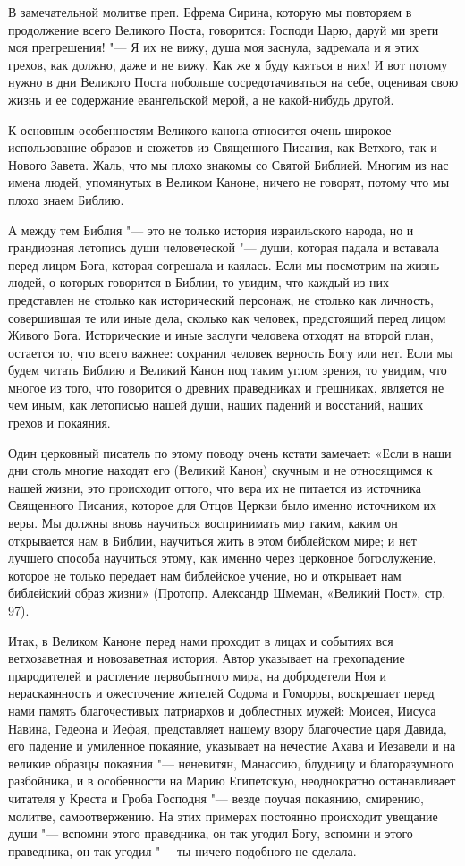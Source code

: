 В замечательной молитве преп. Ефрема Сирина, которую мы повторяем в продолжение всего Великого Поста, говорится: Господи Царю, даруй ми зрети моя прегрешения! "--- Я их не вижу, душа моя заснула, задремала и я этих грехов, как должно, даже и не вижу. Как же я буду каяться в них! И вот потому нужно в дни Великого Поста побольше сосредотачиваться на себе, оценивая свою жизнь и ее содержание евангельской мерой, а не какой-нибудь другой.


К основным особенностям Великого канона относится очень широкое использование образов и сюжетов из Священного Писания, как Ветхого, так и Нового Завета. Жаль, что мы плохо знакомы со Святой Библией. Многим из нас имена людей, упомянутых в Великом Каноне, ничего не говорят, потому что мы плохо знаем Библию.


А между тем Библия "--- это не только история израильского народа, но и грандиозная летопись души человеческой "--- души, которая падала и вставала перед лицом Бога, которая согрешала и каялась. Если мы посмотрим на жизнь людей, о которых говорится в Библии, то увидим, что каждый из них представлен не столько как исторический персонаж, не столько как личность, совершившая те или иные дела, сколько как человек, предстоящий перед лицом Живого Бога. Исторические и иные заслуги человека отходят на второй план, остается то, что всего важнее: сохранил человек верность Богу или нет. Если мы будем читать Библию и Великий Канон под таким углом зрения, то увидим, что многое из того, что говорится о древних праведниках и грешниках, является не чем иным, как летописью нашей души, наших падений и восстаний, наших грехов и покаяния.


Один церковный писатель по этому поводу очень кстати замечает: «Если в наши дни столь многие находят его (Великий Канон) скучным и не относящимся к нашей жизни, это происходит оттого, что вера их не питается из источника Священного Писания, которое для Отцов Церкви было именно источником их веры. Мы должны вновь научиться воспринимать мир таким, каким он открывается нам в Библии, научиться жить в этом библейском мире; и нет лучшего способа научиться этому, как именно через церковное богослужение, которое не только передает нам библейское учение, но и открывает нам библейский образ жизни» (Протопр. Александр Шмеман, «Великий Пост», стр. 97).


Итак, в Великом Каноне перед нами проходит в лицах и событиях вся ветхозаветная и новозаветная история. Автор указывает на грехопадение прародителей и растление первобытного мира, на добродетели Ноя и нераскаянность и ожесточение жителей Содома и Гоморры, воскрешает перед нами память благочестивых патриархов и доблестных мужей: Моисея, Иисуса Навина, Гедеона и Иефая, представляет нашему взору благочестие царя Давида, его падение и умиленное покаяние, указывает на нечестие Ахава и Иезавели и на великие образцы покаяния "--- неневитян, Манассию, блудницу и благоразумного разбойника, и в особенности на Марию Египетскую, неоднократно останавливает читателя у Креста и Гроба Господня "--- везде поучая покаянию, смирению, молитве, самоотвержению. На этих примерах постоянно происходит увещание души "--- вспомни этого праведника, он так угодил Богу, вспомни и этого праведника, он так угодил "--- ты ничего подобного не сделала.


